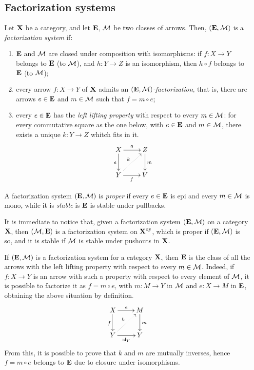 \subsection{Factorization systems}

\begin{definition}\label{def:fact_sys}
	Let $\textbf {\textup{X}}$ be a category, and let $\textbf {\textup{E}}$, $\mathcal{M}$ be two classes of arrows.
	Then, $(\textbf {\textup{E}}, \mathcal{M})$ is a \emph{factorization system} if:
	\begin{enumerate}
		\item $\textbf {\textup{E}}$ and $\mathcal{M}$ are closed under composition with isomorphisms: if $f: X \to Y$ belongs to $\textbf {\textup{E}}$ (to $\mathcal{M}$), and $h: Y\to Z$ is an isomorphism, then $h \circ f$ belongs to $\textbf {\textup{E}}$ (to $\mathcal{M}$);
		\item every arrow $f: X \to Y$ of $\textbf {\textup{X}}$ admits an \emph{$(\textbf {\textup{E}}, \mathcal{M})$-factorization}, that is, there are arrows $e \in \textbf {\textup{E}}$ and $m \in \mathcal{M}$ such that $f = m\circ e$;
		\item every $e \in \textbf {\textup{E}}$ has the \emph{left lifting property} with respect to every $m \in \mathcal{M}$: for every commutative square as the one below, with $e \in \textbf {\textup{E}}$ and $m \in \mathcal{M}$,
			there exists a unique $k: Y \to Z$ whitch fits in it.
			\[\xymatrix{
					X\ar[r]^{g} \ar[d]_e & Z \ar[d]^m \\ Y \ar@{.>}[ur]^k \ar[r]_f & V
			}\]
	\end{enumerate}
	A factorization system $(\textbf {\textup{E}}, \mathcal{M})$ is \emph{proper} if every $e \in \textbf {\textup{E}}$ is epi and every $m \in \mathcal{M}$ is mono, while it is \emph{stable} is $\textbf {\textup{E}}$ is stable under pullbacks.
\end{definition}

\begin{remark}\label{rem:dual_fact_sys}
	It is immediate to notice that, given a factorization system $(\textbf {\textup{E}}, \mathcal{M})$ on a category $\textbf {\textup{X}}$, then $(\mathcal{M}, \textbf {\textup{E}})$ is a factorization system on $\textbf {\textup{X}}^{op}$, which is proper if $(\textbf {\textup{E}}, \mathcal{M})$ is so, and it is stable if
	$\mathcal{M}$ is stable under pushouts in $\textbf {\textup{X}}$.
\end{remark}

\begin{remark}
	If $(\textbf {\textup{E}}, \mathcal{M})$ is a factorization system for a category $\textbf {\textup{X}}$, then $\textbf {\textup{E}}$ is the class of all the arrows with the left lifting property with respect to every $m\in \mathcal{M}$.
	Indeed, if $f:X \to Y$ is an arrow with such a property with respect to every element of $\mathcal{M}$, it is possible to factorize it as $f = m \circ e$, with $m: M \to Y$ in $\mathcal{M}$ and 
	$e: X \to M$ in $\textbf {\textup{E}}$, obtaining the above situation by definition.
	\[\xymatrix{X \ar[r]^e\ar[d]_f & M \ar[d]^m \\ Y \ar[r]_{\id{Y}} \ar@{.>}[ur]^k & Y}\]
	From this, it is possible to prove that $k$ and $m$ are mutually inverses, hence $f = m\circ e$ belongs to $\textbf {\textup{E}}$ due to closure under isomorphisms.
\end{remark}

